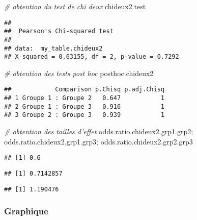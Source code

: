 \documentclass[
]{book}
\newenvironment{Shaded}{\begin{snugshade}}{\end{snugshade}}
\newcommand{\CommentTok}[1]{\textcolor[rgb]{0.56,0.35,0.01}{\textit{#1}}}
\newcommand{\NormalTok}[1]{#1}
\begin{document}
\begin{Shaded}
\begin{Highlighting}[]
\CommentTok{# obtention du test de chi deux }
\NormalTok{chideux2.test}
\end{Highlighting}
\end{Shaded}

\begin{verbatim}
## 
## 	Pearson's Chi-squared test
## 
## data:  my_table.chideux2
## X-squared = 0.63155, df = 2, p-value = 0.7292
\end{verbatim}

\begin{Shaded}
\begin{Highlighting}[]
\CommentTok{# obtention des tests post hoc }
\NormalTok{posthoc.chideux2}
\end{Highlighting}
\end{Shaded}

\begin{verbatim}
##            Comparison p.Chisq p.adj.Chisq
## 1 Groupe 1 : Groupe 2   0.647           1
## 2 Groupe 1 : Groupe 3   0.916           1
## 3 Groupe 2 : Groupe 3   0.939           1
\end{verbatim}

\begin{Shaded}
\begin{Highlighting}[]
\CommentTok{# obtention des tailles d'effet}
\NormalTok{odds.ratio.chideux2.grp1.grp2; odds.ratio.chideux2.grp1.grp3; odds.ratio.chideux2.grp2.grp3}
\end{Highlighting}
\end{Shaded}

\begin{verbatim}
## [1] 0.6
\end{verbatim}

\begin{verbatim}
## [1] 0.7142857
\end{verbatim}

\begin{verbatim}
## [1] 1.190476
\end{verbatim}

\hypertarget{graphique-12}{%
\subsubsection{Graphique}\label{graphique-12}}
\end{document}
